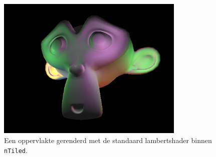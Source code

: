 \begin{figure}
  \centering
  \includegraphics[width=0.8\textwidth]{./img/raw/imp-lambert.png}
  \caption{Een oppervlakte gerenderd met de standaard lambertshader binnen \texttt{nTiled}.}
  \label{fig:imp-lambert}
\end{figure}
